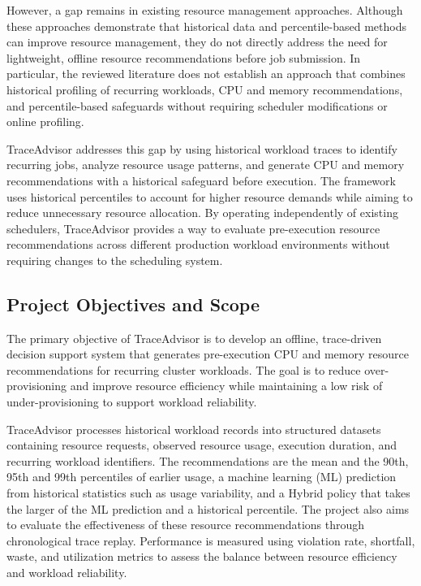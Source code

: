 However, a gap remains in existing resource management approaches. Although these approaches demonstrate that historical data and percentile-based methods can improve resource management, they do not directly address the need for lightweight, offline resource recommendations before job submission. In particular, the reviewed literature does not establish an approach that combines historical profiling of recurring workloads, CPU and memory recommendations, and percentile-based safeguards without requiring scheduler modifications or online profiling.

TraceAdvisor addresses this gap by using historical workload traces to identify recurring jobs, analyze resource usage patterns, and generate CPU and memory recommendations with a historical safeguard before execution. The framework uses historical percentiles to account for higher resource demands while aiming to reduce unnecessary resource allocation. By operating independently of existing schedulers, TraceAdvisor provides a way to evaluate pre-execution resource recommendations across different production workload environments without requiring changes to the scheduling system.

\subsection{Project Objectives and Scope}\label{sec:1.4}

The primary objective of TraceAdvisor is to develop an offline, trace-driven decision support system that generates pre-execution CPU and memory resource recommendations for recurring cluster workloads. The goal is to reduce over-provisioning and improve resource efficiency while maintaining a low risk of under-provisioning to support workload reliability.

TraceAdvisor processes historical workload records into structured datasets containing resource requests, observed resource usage, execution duration, and recurring workload identifiers. The recommendations are the mean and the 90th, 95th and 99th percentiles of earlier usage, a machine learning (ML) prediction from historical statistics such as usage variability, and a Hybrid policy that takes the larger of the ML prediction and a historical percentile. The project also aims to evaluate the effectiveness of these resource recommendations through chronological trace replay. Performance is measured using violation rate, shortfall, waste, and utilization metrics to assess the balance between resource efficiency and workload reliability.

